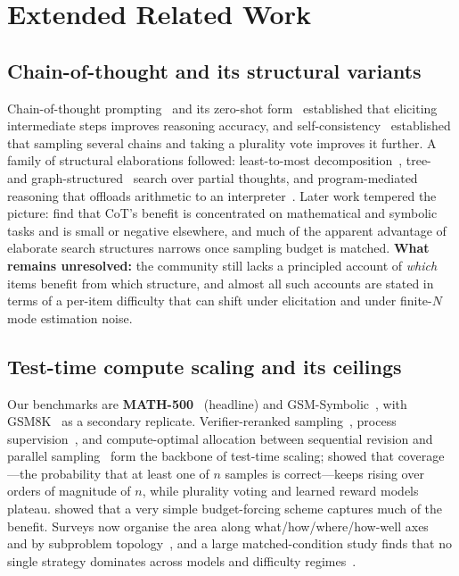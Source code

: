 \section{Extended Related Work}
\label{app:related}
\label{sec:related}

\subsection{Chain-of-thought and its structural variants}

Chain-of-thought prompting~\citep{wei2022cot} and its zero-shot
form~\citep{kojima2022zeroshot} established that eliciting intermediate steps
improves reasoning accuracy, and self-consistency~\citep{wang2023selfconsistency}
established that sampling several chains and taking a plurality vote improves
it further. A family of structural elaborations followed:
least-to-most decomposition~\citep{zhou2023leasttomost}, tree-~\citep{yao2023tot}
and graph-structured~\citep{besta2024got} search over partial thoughts, and
program-mediated reasoning that offloads arithmetic to an
interpreter~\citep{chen2023pot,gao2023pal}. Later work tempered the picture:
\citet{sprague2025tocot} find that CoT's benefit is concentrated on
mathematical and symbolic tasks and is small or negative elsewhere, and much of
the apparent advantage of elaborate search structures narrows once sampling
budget is matched. \textbf{What remains unresolved:} the community still lacks
a principled account of \emph{which} items benefit from which structure, and
almost all such accounts are stated in terms of a per-item difficulty that can
shift under elicitation and under finite-$N$ mode estimation noise.

\subsection{Test-time compute scaling and its ceilings}

Our benchmarks are \textbf{MATH-500}~\citep{math500} (headline) and
GSM-Symbolic~\citep{mirzadeh2025gsmsymbolic}, with GSM8K~\citep{cobbe2021gsm8k}
as a secondary replicate. Verifier-reranked sampling~\citep{cobbe2021gsm8k}, process
supervision~\citep{lightman2024verify,uesato2022process,wang2024mathshepherd},
and compute-optimal allocation between sequential revision and parallel
sampling~\citep{snell2024scaling,wu2024inference} form the backbone of
test-time scaling; \citet{brown2024monkeys} showed that coverage---the
probability that at least one of $n$ samples is correct---keeps rising over
orders of magnitude of $n$, while plurality voting and learned reward models
plateau. \citet{muennighoff2025s1} showed that a very simple budget-forcing
scheme captures much of the benefit. Surveys now organise the
area along what/how/where/how-well axes~\citep{zhang2025ttssurvey} and by
subproblem topology~\citep{subproblemsurvey2025}, and a large matched-condition
study finds that no single strategy dominates across models and difficulty
regimes~\citep{artofscaling2025}.

